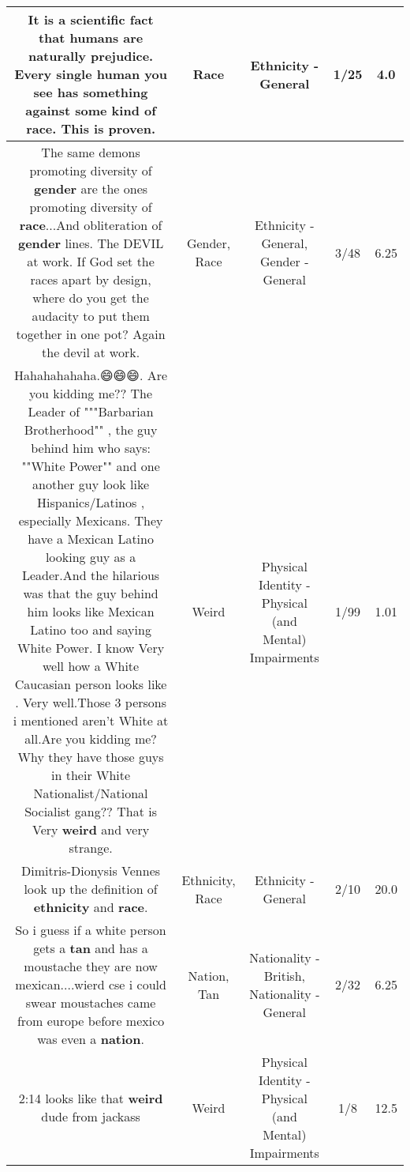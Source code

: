 \documentclass[11pt]{article}
\newlength\mylength
\begin{document}
\begin{center}
\begin{longtable}{|C{.65\mylength}|C{.30\mylength}|C{.12\mylength}|C{.12\mylength}|C{.12\mylength}|}
  \small It is a scientific fact that humans are naturally prejudice. Every single human you see has something against some kind of \textbf{race}. This is proven.\normalsize   & Race & Ethnicity - General & 1/25 & 4.0 \\  \hline
  \small The same demons promoting diversity of \textbf{gender} are the ones promoting diversity of \textbf{race}...And obliteration of \textbf{gender} lines. The DEVIL at work. If God set the races apart by design, where do you get the audacity to put them together in one pot?  Again the devil at work.\normalsize   & Gender, Race & Ethnicity - General, Gender - General & 3/48 & 6.25 \\  \hline
  \small Hahahahahaha.😄😄😄. Are you kidding me?? The Leader of """Barbarian Brotherhood"" , the guy behind him who says: ""White Power"" and one another guy look like Hispanics/Latinos , especially Mexicans. They have a Mexican Latino looking guy as a Leader.And the hilarious was that the guy behind him looks like Mexican Latino too and saying White Power. I know Very well how a White Caucasian person looks like . Very well.Those 3 persons i mentioned aren't White at all.Are you kidding me? Why they have those guys in their White Nationalist/National Socialist gang?? That is Very \textbf{weird} and very strange.\normalsize   & Weird & Physical Identity - Physical (and Mental) Impairments & 1/99 & 1.01 \\  \hline
  \small Dimitris-Dionysis Vennes look up the definition of \textbf{ethnicity} and \textbf{race}.\normalsize   & Ethnicity, Race & Ethnicity - General & 2/10 & 20.0 \\  \hline
  \small So i guess if a white person gets a \textbf{tan} and has a moustache they are now mexican....wierd cse i could swear moustaches came from europe before mexico was even a \textbf{nation}.\normalsize   & Nation, Tan & Nationality - British, Nationality - General & 2/32 & 6.25 \\  \hline
  \small 2:14 looks like that \textbf{weird} dude from jackass\normalsize   & Weird & Physical Identity - Physical (and Mental) Impairments & 1/8 & 12.5 \\  \hline

\end{longtable}
\end{center}
\end{document}
